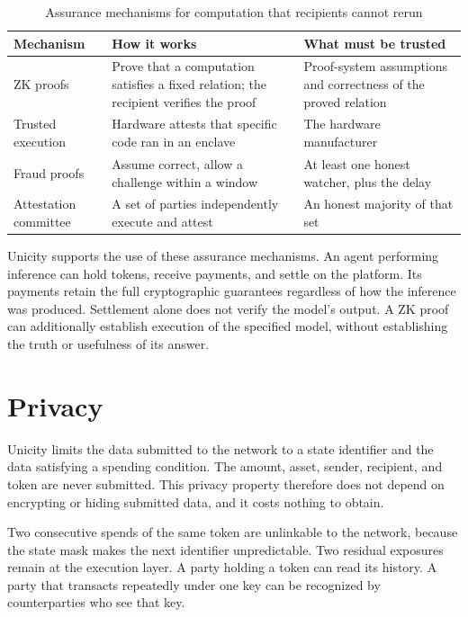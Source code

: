 \begin{table}[h]
    \centering
    \caption{Assurance mechanisms for computation that recipients cannot rerun}
    \label{tab:verifexec}
    \begin{tabular}{@{}lp{5.4cm}p{4.3cm}@{}}
        \toprule
        \textbf{Mechanism} & \textbf{How it works} & \textbf{What must be trusted} \\
        \midrule
        ZK proofs & Prove that a computation satisfies a fixed relation; the recipient verifies the proof & Proof-system assumptions and correctness of the proved relation \\
        \addlinespace
        Trusted execution & Hardware attests that specific code ran in an enclave & The hardware manufacturer \\
        \addlinespace
        Fraud proofs & Assume correct, allow a challenge within a window & At least one honest watcher, plus the delay \\
        \addlinespace
        Attestation committee & A set of parties independently execute and attest & An honest majority of that set \\
        \bottomrule
    \end{tabular}
\end{table}

Unicity supports the use of these assurance mechanisms. An agent performing inference can hold tokens, receive payments, and settle on the platform. Its payments retain the full cryptographic guarantees regardless of how the inference was produced. Settlement alone does not verify the model's output. A ZK proof can additionally establish execution of the specified model, without establishing the truth or usefulness of its answer.

\section{Privacy}\label{sec:privacy}

Unicity limits the data submitted to the network to a state identifier and the data satisfying a spending condition. The amount, asset, sender, recipient, and token are never submitted. This privacy property therefore does not depend on encrypting or hiding submitted data, and it costs nothing to obtain.

Two consecutive spends of the same token are unlinkable to the network, because the state mask makes the next identifier unpredictable. Two residual exposures remain at the execution layer. A party holding a token can read its history. A party that transacts repeatedly under one key can be recognized by counterparties who see that key.

